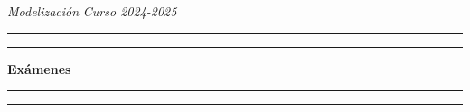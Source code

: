 \documentclass[11pt]{report}
\begin{document}
\noindent \textit{Modelización} \hfill \textit{Curso 2024-2025}

\vspace{-5mm}

\begin{center}

	\rule{\textwidth}{1.6pt}\vspace*{-\baselineskip}\vspace*{2pt} %
	\rule{\textwidth}{0.4pt} %
	
    \vspace{3mm}

	{\LARGE \textbf{Exámenes}} %

    \vspace{2mm}
	
	\rule[0.66\baselineskip]{\textwidth}{0.4pt}\vspace*{-\baselineskip}\vspace{3.2pt} %
	\rule[0.66\baselineskip]{\textwidth}{1.6pt} %

\end{center}
\end{document}

